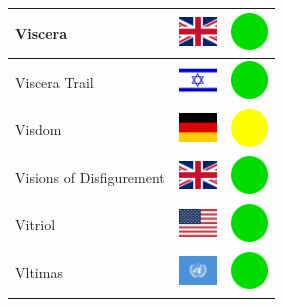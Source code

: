 \documentclass[12pt, a4paper, twoside]{report}
\begin{document}
\begin{center}
\begin{longtable}{|p{5cm}|p{2cm}|p{2cm}|}
 Viscera                                                    & \includegraphics[width=1cm]{../4x3/gb} &   \includegraphics[width=1cm]{../likes/y} \\ \hline
 Viscera Trail                                              & \includegraphics[width=1cm]{../4x3/il} &   \includegraphics[width=1cm]{../likes/y} \\ \hline
 Visdom                                                     & \includegraphics[width=1cm]{../4x3/de} &   \includegraphics[width=1cm]{../likes/m} \\ \hline
 Visions of Disfigurement                                   & \includegraphics[width=1cm]{../4x3/gb} &   \includegraphics[width=1cm]{../likes/y} \\ \hline
 Vitriol                                                    & \includegraphics[width=1cm]{../4x3/us} &   \includegraphics[width=1cm]{../likes/y} \\ \hline
 Vltimas                                                    & \includegraphics[width=1cm]{../4x3/un} &   \includegraphics[width=1cm]{../likes/y} \\ \hline

\end{longtable}
\end{center}
\end{document}
